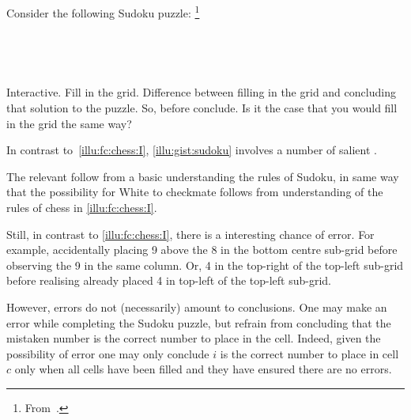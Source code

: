 \begin{note}
  \begin{illustration}[Sudoku]
    \label{illu:gist:sudoku}
    Consider the following Sudoku puzzle:%
    \footnote{
      From~\textcite[84]{Coussement:2007up}.
    }
    \vspace{\baselineskip}

    \mbox{ }\hfill%
    \begin{adjustbox}{minipage=0.45\linewidth,scale=1}
      \centering
    \end{adjustbox}%
    \hfill\mbox{ }

  \end{illustration}

  {
    \color{red}
    Interactive.
    Fill in the grid.
    Difference between filling in the grid and concluding that solution to the puzzle.
    So, before conclude.
    Is it the case that you would fill in the grid the same way?
  }

  In contrast to~\autoref{illu:fc:chess:I}, \autoref{illu:gist:sudoku} involves a number of salient \fc{}.

  The relevant  follow from a basic understanding the rules of Sudoku, in same way that the possibility for White to checkmate follows from understanding of the rules of chess in \autoref{illu:fc:chess:I}.

  Still, in contrast to \autoref{illu:fc:chess:I}, there is a interesting chance of error.
  For example, accidentally placing 9 above the 8 in the bottom centre sub-grid before observing the 9 in the same column.
  Or, 4 in the top-right of the top-left sub-grid before realising already placed 4 in top-left of the top-left sub-grid.

  However, errors do not (necessarily) amount to conclusions.
  One may make an error while completing the Sudoku puzzle, but refrain from concluding that the mistaken number is the correct number to place in the cell.
  Indeed, given the possibility of error one may only conclude \(i\) is the correct number to place in cell \(c\) only when all cells have been filled and they have ensured there are no errors.
\end{note}

